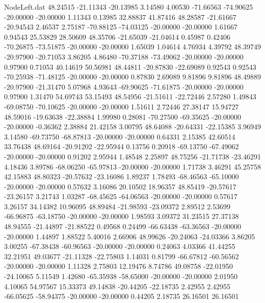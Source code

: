 \begin{filecontents}{NodeLeft.dat}
  48.24515  -21.11343  -20.13985     3.14580    4.00530  -71.66563  -74.90625  -20.00000  -20.00000    1.11343    0.13985   32.88837   41.87416
  48.28587  -21.61667  -20.94543     2.46537    2.75187  -70.88125  -74.03125  -20.00000  -20.00000    1.61667    0.94543   25.53829   28.50609
  48.35706  -21.65039  -21.04614     0.45987    0.42406  -70.26875  -73.51875  -20.00000  -20.00000    1.65039    1.04614    4.76934    4.39792
  48.39749  -20.97900  -20.71053     3.86205    4.86480  -70.37188  -73.49062  -20.00000  -20.00000    0.97900    0.71053   40.14619   50.56981
  48.44811  -20.87830  -22.69089     0.92543    0.92543  -70.25938  -71.48125  -20.00000  -20.00000    0.87830    2.69089    9.81896    9.81896
  48.49889  -20.97900  -21.31470     5.07968    4.93643  -69.90625  -71.61875  -20.00000  -20.00000    0.97900    1.31470   54.69743   53.15493
  48.54956  -21.51611  -22.72446     2.57280    1.49843  -69.08750  -70.10625  -20.00000  -20.00000    1.51611    2.72446   27.38147   15.94727
  48.59016  -19.63638  -22.38884     1.99980    0.28081  -70.27500  -69.35625  -20.00000  -20.00000   -0.36362    2.38884   21.42158    3.00795
  48.64088  -20.64331  -22.15385     3.96949    3.14580  -69.73750  -68.87813  -20.00000  -20.00000    0.64331    2.15385   42.60514   33.76438
  48.69164  -20.91202  -22.95944     0.13756    0.20918  -69.13750  -67.49062  -20.00000  -20.00000    0.91202    2.95944    1.48548    2.25897
  48.75256  -21.71738  -23.46291     4.18436    3.89786  -68.06250  -65.97813  -20.00000  -20.00000    1.71738    3.46291   45.25758   42.15883
  48.80323  -20.57632  -23.16086     1.89237    1.78493  -68.46563  -65.10000  -20.00000  -20.00000    0.57632    3.16086   20.10502   18.96357
  48.85419  -20.57617  -23.26157     3.21743    1.03287  -68.45625  -64.06563  -20.00000  -20.00000    0.57617    3.26157   34.14382   10.96095
  48.89484  -21.98593  -23.09372     2.89512    2.53699  -66.96875  -63.18750  -20.00000  -20.00000    1.98593    3.09372   31.23515   27.37138
  48.94555  -21.44897  -21.88522     0.49568    0.24499  -66.63438  -63.36563  -20.00000  -20.00000    1.44897    1.88522    5.40016    2.66906
  48.99626  -20.24063  -24.03366     3.86205    3.00255  -67.38438  -60.96563  -20.00000  -20.00000    0.24063    4.03366   41.44255   32.21951
  49.03677  -21.11328  -22.75803     1.14031    0.81799  -66.67812  -60.56562  -20.00000  -20.00000    1.11328    2.75803   12.19476    8.74786
  49.08758  -22.01950  -24.10065     5.11549    1.42680  -65.35938  -58.65000  -20.00000  -20.00000    2.01950    4.10065   54.97567   15.33373
  49.14838  -20.44205  -22.18735     2.42955    2.42955  -66.05625  -58.94375  -20.00000  -20.00000    0.44205    2.18735   26.16501   26.16501

\end{filecontents}
